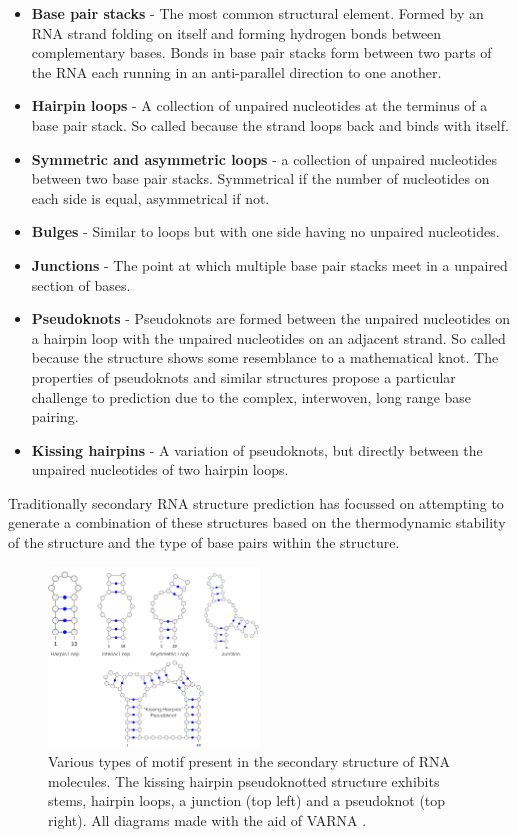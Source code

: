 \documentclass[journal]{IEEEtran}
\begin{document}
\begin{itemize}
	\item \textbf{Base pair stacks} - The most common structural element. Formed by an RNA strand folding on itself and forming hydrogen bonds between complementary bases. Bonds in base pair stacks form between two parts of the RNA each running in an anti-parallel direction to one another. 
	\item \textbf{Hairpin loops} - A collection of unpaired nucleotides at the terminus of a base pair stack. So called because the strand loops back and binds with itself.
	\item \textbf{Symmetric and asymmetric loops} - a collection of unpaired nucleotides between two base pair stacks. Symmetrical if the number of nucleotides on each side is equal, asymmetrical if not.
	\item \textbf{Bulges} - Similar to loops but with one side having no unpaired nucleotides.
	\item \textbf{Junctions} - The point at which multiple base pair stacks meet in a unpaired section of bases.
	\item \textbf{Pseudoknots} - Pseudoknots are formed between the unpaired nucleotides on a hairpin loop with the unpaired nucleotides on an adjacent strand. So called because the structure shows some resemblance to a mathematical knot. The properties of pseudoknots and similar structures propose a particular challenge to prediction due to the complex, interwoven, long range base pairing.
	\item \textbf{Kissing hairpins} - A variation of pseudoknots, but directly between the unpaired nucleotides of two hairpin loops.
\end{itemize}

Traditionally secondary RNA structure prediction has focussed on attempting to generate a combination of these structures based on the thermodynamic stability of the structure and the type of base pairs within the structure.

\begin{figure}[t]
\centering
\includegraphics[width=0.5\textwidth]{img/secondary_structure_types.png}
\caption{Various types of motif present in the secondary structure of RNA molecules. The kissing hairpin pseudoknotted structure exhibits stems, hairpin loops, a junction (top left) and a pseudoknot (top right). All diagrams made with the aid of VARNA \cite{darty2009varna}.}
\label{fig:secondary-structure-types}
\end{figure}
\end{document}
